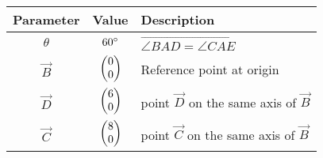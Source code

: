 \begin{tabular}{|c|c|p{5cm}|}
\hline
\textbf{Parameter} & \textbf{Value} & \textbf{Description} \\
\hline
	$\theta$ & $60\degree$ & $\vec{\angle{BAD} = \angle{CAE}}$ \\
\hline
	$\vec{B}$ & $\begin{pmatrix}0\\0\end{pmatrix}$ & Reference point at origin \\
\hline
	$\vec{D}$ & $\begin{pmatrix}6\\0\end{pmatrix}$ & point $\vec{D}$ on the same axis of $\vec{B}$ \\
\hline
	$\vec{C}$ & $\begin{pmatrix}8\\0\end{pmatrix}$ & point $\vec{C}$ on the same axis of $\vec{B}$ \\
\hline
\end{tabular}
